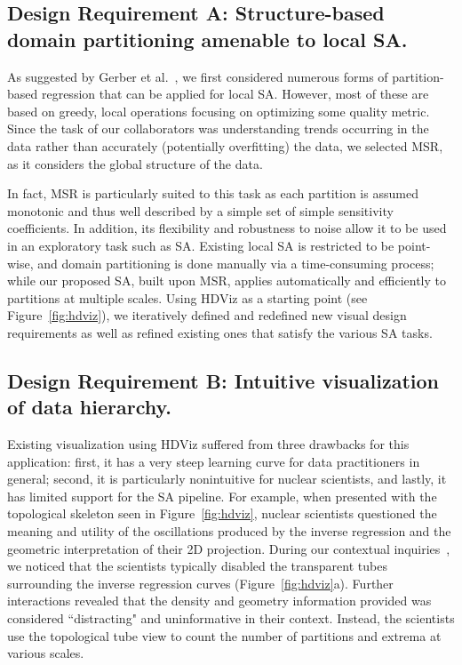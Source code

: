 \subsection{Design Requirement A: Structure-based domain partitioning amenable to local SA.}
As suggested by Gerber et al.~\cite{GerberRubelBremer2011}, we first considered numerous forms of partition-based regression that can be applied for local SA.
%
However, most of these are based on greedy, local operations focusing on optimizing some quality metric.
%
Since the task of our collaborators was understanding trends occurring in the data rather than accurately (potentially overfitting) the data, we selected MSR, as it considers the global structure of the data.

In fact, MSR is particularly suited to this task as each partition is assumed monotonic and thus well described by a simple set of simple sensitivity coefficients.
%
In addition, its flexibility and robustness to noise allow it to be used in an exploratory task such as SA.
%
Existing local SA is restricted to be point-wise, and domain partitioning is done manually via a time-consuming process; while our proposed SA, built upon MSR, applies automatically and efficiently to partitions at multiple scales.
%
Using HDViz as a starting point (see Figure~\ref{fig:hdviz}), we iteratively defined and redefined new visual design requirements as well as refined existing ones that satisfy the various SA tasks.


\subsection{Design Requirement B: Intuitive visualization of data hierarchy.}
Existing visualization using HDViz suffered from three drawbacks for this application: first, it has a very steep learning curve for data practitioners in general; second, it is particularly nonintuitive for nuclear scientists, and lastly, it has limited support for the SA pipeline.
%
For example, when presented with the topological skeleton seen in Figure~\ref{fig:hdviz}, nuclear scientists questioned the meaning and utility of the oscillations produced by the inverse regression and the geometric interpretation of their 2D projection.
%
During our contextual inquiries~\cite{HoltzblattJones1993}, we noticed that the scientists typically disabled the transparent tubes surrounding the inverse regression curves (Figure~\ref{fig:hdviz}a).
%
Further interactions revealed that the density and geometry information provided was considered ``distracting" and uninformative in their context. Instead, the scientists use the topological tube view to count the number of partitions and extrema at various scales.

